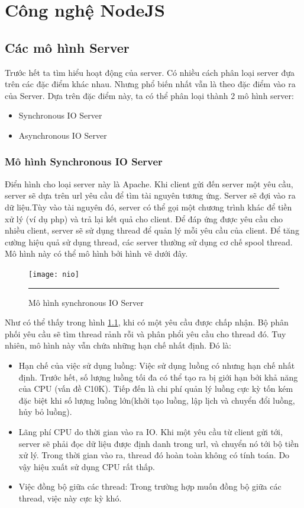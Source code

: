 ﻿\chapter{Công nghệ NodeJS}
\label{Công nghệ NodeJS}

\section{Các mô hình Server}
    Trước hết ta tìm hiểu hoạt động của server. Có nhiều cách phân loại server đựa trên các đặc điểm khác nhau. Nhưng phổ biến nhất vẫn là theo đặc điểm vào ra của Server. Dựa trên đặc điểm này, ta có thể phân loại thành 2 mô hình server:
	\begin{itemize}
		\item Synchronous IO Server
		\item Asynchronous IO Server
	\end{itemize}
\subsection{Mô hình Synchronous IO Server}
	Điển hình cho loại server này là Apache. Khi client gửi đến server một yêu cầu, server sẽ dựa trên url yêu cầu để tìm tài nguyên tương ứng. Server sẽ đợi vào ra dữ liệu.Tùy vào tài nguyên đó, server có thể gọi một chương trình khác để tiền xử lý (ví dụ php) và trả lại kết quả cho client. Để đáp ứng được yêu cầu cho nhiều client, server sẽ sử dụng thread để quản lý mỗi yêu cầu của client. Để tăng cường hiệu quả sử dụng thread, các server thường sử dụng cơ chế spool thread. Mô hình này có thể mô hình bởi hình vẽ dưới đây. \\
	\begin{figure}
        \centering
        \texttt{[image: nio]}
        \rule{35em}{0.5pt}
        \caption{Mô hình synchronous IO Server}
        \label{fig:nio}
    \end{figure}
	Như có thể thấy trong hình \ref{fig:nio}, khi có một yêu cầu được chấp nhận. Bộ phân phối yêu cầu sẽ tìm thread rảnh rỗi và phân phổi yêu cầu cho thread đó.
	Tuy nhiên, mô hình này vẫn chứa những hạn chế nhất định. Đó là: \\
	\begin{itemize}
		\item Hạn chế của  việc sử dụng luồng: Việc sử dụng luồng có nhưng hạn chế nhất định. Trước hết, số lượng luồng tối đa có thể tạo ra bị giới hạn bởi khả năng của CPU (vấn đề C10K). Tiếp đến là chi phí quản lý luồng cực kỳ tốn kém đặc biệt khi số lượng luồng lớn(khởi tạo luồng, lập lịch và chuyển đổi luồng, hủy bỏ luồng).
		\item Lãng phí CPU do thời gian vào ra IO. Khi một yêu cầu từ client gửi tới, server sẽ phải đọc dữ liệu được định danh trong url, và chuyển nó tới bộ tiền xử lý. Trong thời gian vào ra, thread đó hoàn toàn không có tính toán. Do vậy hiệu xuất sử dụng CPU rất thấp.
		\item Việc đồng bộ giữa các thread: Trong trường hợp  muốn đồng bộ giữa các thread, việc này cực kỳ khó.
	\end{itemize}

